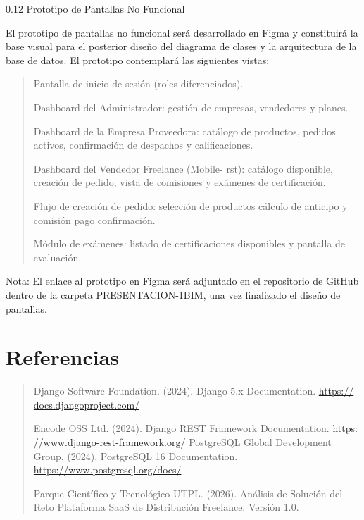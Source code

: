 \documentclass[
]{article}
\begin{document}
0.12 Prototipo de Pantallas No Funcional

El prototipo de pantallas no funcional será desarrollado en Figma y
constituirá la base visual para el posterior diseño del diagrama de
clases y la arquitectura de la base de datos. El prototipo contemplará
las siguientes vistas:

\begin{quote}
Pantalla de inicio de sesión (roles diferenciados).

Dashboard del Administrador: gestión de empresas, vendedores y planes.

Dashboard de la Empresa Proveedora: catálogo de productos, pedidos
activos, confirmación de despachos y calificaciones.

Dashboard del Vendedor Freelance (Mobile- rst): catálogo disponible,
creación de pedido, vista de comisiones y exámenes de certificación.

Flujo de creación de pedido: selección de productos cálculo de anticipo
y comisión pago confirmación.

Módulo de exámenes: listado de certificaciones disponibles y pantalla de
evaluación.
\end{quote}

Nota: El enlace al prototipo en Figma será adjuntado en el repositorio
de GitHub dentro de la carpeta PRESENTACION-1BIM, una vez finalizado el
diseño de pantallas.

\section{Referencias}\label{referencias}

\begin{quote}
Django Software Foundation. (2024). Django 5.x Documentation.
\href{https://docs.djangoproject.com/}{https:// docs.djangoproject.com/}

Encode OSS Ltd. (2024). Django REST Framework Documentation.
\href{https://www.django-rest-framework.org/}{https:
//www.django-rest-framework.org/} PostgreSQL Global Development Group.
(2024). PostgreSQL 16 Documentation.
\url{https://www.postgresql.org/docs/}

Parque Científico y Tecnológico UTPL. (2026). Análisis de Solución del
Reto Plataforma SaaS de Distribución Freelance. Versión 1.0.
\end{quote}
\end{document}
